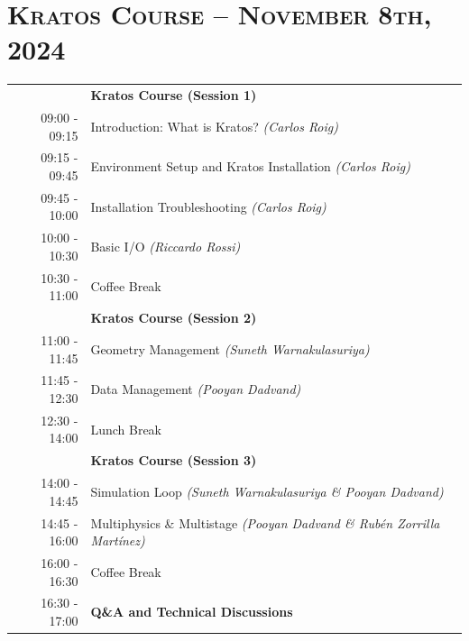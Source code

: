\documentclass{article}
\begin{document}
\newpage
\section*{\centering \textsc{Kratos Course -- November 8th, 2024}}


\begin{table}[h]\centering
   \begin{tabularx}{0.85\textwidth}{r|X}
      \toprule%
                    & {\large \textbf{Kratos Course (Session 1)}} \\%
      09:00 - 09:15 & Introduction: What is Kratos? \textit{(Carlos Roig)} \\%
      09:15 - 09:45 & Environment Setup and Kratos Installation \textit{(Carlos Roig)} \\%
      09:45 - 10:00 & Installation Troubleshooting \textit{(Carlos Roig)} \\%
      10:00 - 10:30 & Basic I/O \textit{(Riccardo Rossi)} \\%
      \midrule%
      \rowcolor{SeaGreen3!5!} 10:30 - 11:00 & Coffee Break \\%
      \midrule%
                    & {\large \textbf{Kratos Course (Session 2)}} \\%
      11:00 - 11:45 & Geometry Management \textit{(Suneth Warnakulasuriya)} \\%
      11:45 - 12:30 & Data Management \textit{(Pooyan Dadvand)} \\%
      \midrule%
      \rowcolor{SeaGreen3!5!} 12:30 - 14:00 & Lunch Break \\%
      \midrule%
                    & {\large \textbf{Kratos Course (Session 3)}} \\%
      14:00 - 14:45 & Simulation Loop \textit{(Suneth Warnakulasuriya \& Pooyan Dadvand)} \\%
      14:45 - 16:00 & Multiphysics \& Multistage \textit{(Pooyan Dadvand \& Rubén Zorrilla Martínez)} \\%
      \midrule%
      \rowcolor{SeaGreen3!5!} 16:00 - 16:30 & Coffee Break \\%
      \midrule%
      16:30 - 17:00 & {\large \textbf{Q\&A and Technical Discussions}} \\%
      \bottomrule
   \end{tabularx}
\end{table}
\end{document}
